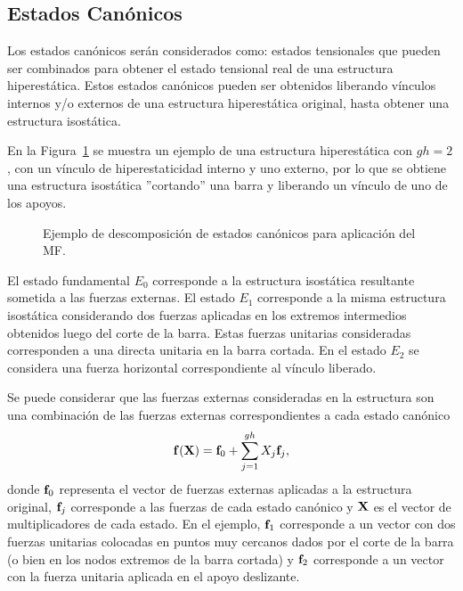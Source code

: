 \subsection{Estados Canónicos}

Los estados canónicos serán considerados como: estados tensionales que pueden ser combinados para obtener el estado tensional real de una estructura hiperestática. %
%
Estos estados canónicos pueden ser obtenidos liberando vínculos internos y/o externos de una estructura hiperestática original, hasta obtener una estructura isostática.

En la Figura~\ref{fig:estadoscanon} se muestra un ejemplo de una estructura hiperestática con $gh=2$, con un vínculo de hiperestaticidad interno y uno externo, por lo que se obtiene una estructura isostática ''cortando'' una barra y liberando un vínculo de uno de los apoyos. %


\begin{figure}[htb]
	\centering
	\def\svgwidth{0.95\textwidth}

	\caption{Ejemplo de descomposición de estados canónicos para aplicación del MF.}
	\label{fig:estadoscanon}
\end{figure}

El estado fundamental $E_0$ corresponde a la estructura isostática resultante sometida a las fuerzas externas. %
%
El estado $E_1$ corresponde a la misma estructura isostática considerando dos fuerzas aplicadas en los extremos intermedios obtenidos luego del corte de la barra. Estas fuerzas unitarias consideradas corresponden a una directa unitaria en la barra cortada. %
%
En el estado $E_2$ se considera una fuerza horizontal correspondiente al vínculo liberado.
%



Se puede considerar que las fuerzas externas consideradas en la estructura son una combinación de las fuerzas externas correspondientes a cada estado canónico
%
\begin{equation}\label{eqn:fueX}
{\bf f}({\bf X}) = {\bf f}_0 + \sum_{j=1}^{gh} X_j {\bf f}_j,
\end{equation}
donde  ${\bf f}_0$ representa el vector de fuerzas externas aplicadas a la estructura original, ${\bf f}_j$ corresponde a las fuerzas de cada estado canónico y ${\bf X}$ es el vector de multiplicadores de cada estado.
%
En el ejemplo, ${\bf f}_1$ corresponde a un vector con dos fuerzas unitarias colocadas en puntos muy cercanos dados por el corte de la barra (o bien en los nodos extremos de la barra cortada) y ${\bf f}_2$ corresponde a un vector con la fuerza unitaria aplicada en el apoyo deslizante.

